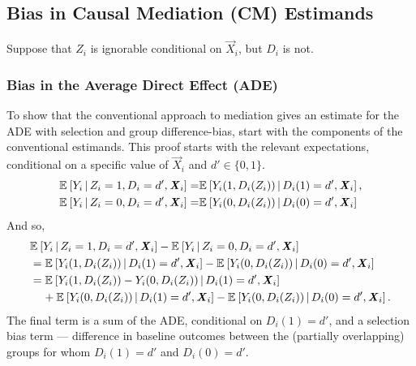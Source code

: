 
% 
%

\subsection{Bias in Causal Mediation (CM) Estimands}
\label{appendix:mediation-bias}
Suppose that $Z_i$ is ignorable conditional on $\vec X_i$, but $D_i$ is not.

\subsubsection{Bias in the Average Direct Effect (ADE)}
To show that the conventional approach to mediation gives an estimate for the ADE with selection and group difference-bias, start with the components of the conventional estimands.
This proof starts with the relevant expectations, conditional on a specific value of $\vec X_i$ and $d' \in \{0, 1 \}$.
\begin{align*}
    \mathbb{E}_{} \left[ Y_i \, \middle\vert \, Z_i = 1, D_i = d', \boldsymbol{\mathit{X}}_i \right]
    =& \mathbb{E}_{} \left[ Y_i(1, D_i(Z_i)) \, \middle\vert \, D_i(1) = d', \boldsymbol{\mathit{X}}_i \right], \\
    \mathbb{E}_{} \left[ Y_i \, \middle\vert \, Z_i = 0, D_i = d', \boldsymbol{\mathit{X}}_i \right]
    =& \mathbb{E}_{} \left[ Y_i(0, D_i(Z_i)) \, \middle\vert \, D_i(0) = d', \boldsymbol{\mathit{X}}_i \right]
\end{align*}
And so,
\begin{align*}
    &  \mathbb{E}_{} \left[ Y_i \, \middle\vert \, Z_i = 1, D_i = d', \boldsymbol{\mathit{X}}_i \right]
    - \mathbb{E}_{} \left[ Y_i \, \middle\vert \, Z_i = 0, D_i = d', \boldsymbol{\mathit{X}}_i \right] \\
    &= \mathbb{E}_{} \left[ Y_i(1, D_i(Z_i)) \, \middle\vert \, D_i(1) = d', \boldsymbol{\mathit{X}}_i \right]
    - \mathbb{E}_{} \left[ Y_i(0, D_i(Z_i)) \, \middle\vert \, D_i(0) = d', \boldsymbol{\mathit{X}}_i \right] \\
    &= \mathbb{E}_{} \left[ Y_i(1, D_i(Z_i)) - Y_i(0, D_i(Z_i)) \, \middle\vert \, D_i(1) = d', \boldsymbol{\mathit{X}}_i \right] \\
    &\;\;\;\;+ \mathbb{E}_{} \left[ Y_i(0, D_i(Z_i)) \, \middle\vert \, D_i(1) = d', \boldsymbol{\mathit{X}}_i \right]
        - \mathbb{E}_{} \left[ Y_i(0, D_i(Z_i)) \, \middle\vert \, D_i(0) = d', \boldsymbol{\mathit{X}}_i \right].
\end{align*}
The final term is a sum of the ADE, conditional on $D_i(1) = d'$, and a selection bias term --- difference in baseline outcomes between the (partially overlapping) groups for whom $D_i(1) = d'$ and $D_i(0) = d'$.

